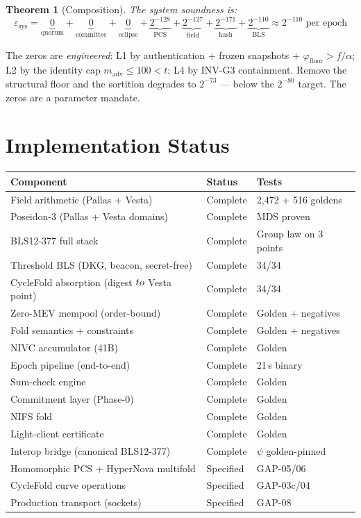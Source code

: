 \documentclass[11pt,a4paper]{article}
\newtheorem{theorem}{Theorem}
\begin{document}
\begin{theorem}[Composition]
The system soundness is:
\[
\varepsilon_{\text{sys}} = \underbrace{0}_{\text{quorum}}
+ \underbrace{0}_{\text{committee}}
+ \underbrace{0}_{\text{eclipse}}
+ \underbrace{2^{-128}}_{\text{PCS}}
+ \underbrace{2^{-127}}_{\text{field}}
+ \underbrace{2^{-171}}_{\text{hash}}
+ \underbrace{2^{-110}}_{\text{BLS}}
\approx 2^{-110} \text{ per epoch}
\]
\end{theorem}

The zeros are \emph{engineered}: L1 by authentication + frozen
snapshots + $\varphi_{\text{floor}} > f/\alpha$; L2 by the identity
cap $m_{\text{adv}} \le 100 < t$; L4 by INV-G3 containment. Remove
the structural floor and the sortition degrades to $2^{-73}$ ---
below the $2^{-80}$ target. The zeros are a parameter mandate.

\section{Implementation Status}

\begin{table}[h]
\centering
\begin{tabular}{l|l|l}
\textbf{Component} & \textbf{Status} & \textbf{Tests} \\
\hline
Field arithmetic (Pallas + Vesta) & Complete & 2{,}472 + 516 goldens \\
Poseidon-3 (Pallas + Vesta domains) & Complete & MDS proven \\
BLS12-377 full stack & Complete & Group law on 3 points \\
Threshold BLS (DKG, beacon, secret-free) & Complete & 34/34 \\
CycleFold absorption (digest $\\to$ Vesta point) & Complete & 34/34 \\
Zero-MEV mempool (order-bound) & Complete & Golden + negatives \\
Fold semantics + constraints & Complete & Golden + negatives \\
NIVC accumulator (41B) & Complete & Golden \\
Epoch pipeline (end-to-end) & Complete & 21\,s binary \\
Sum-check engine & Complete & Golden \\
Commitment layer (Phase-0) & Complete & Golden \\
NIFS fold & Complete & Golden \\
Light-client certificate & Complete & Golden \\
Interop bridge (canonical BLS12-377) & Complete & $\psi$ golden-pinned \\
\hline
Homomorphic PCS + HyperNova multifold & Specified & GAP-05/06 \\
CycleFold curve operations & Specified & GAP-03c/04 \\
Production transport (sockets) & Specified & GAP-08 \\
\end{tabular}
\end{table}
\end{document}
